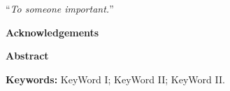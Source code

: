 \documentclass[
12pt, english,
onehalfspacing, %
nolistspacing, %
liststotoc, %
headsepline, %
consistentlayout, %
]{Thesis} %
\begin{document}
\hfill \enquote{\large \itshape To someone important.}\bigbreak

\newpage
\newpage


\begin{center}
{\bf \Large Acknowledgements}
\end{center}

\vspace{2cm}

\lipsum[2-3]

\newpage
\newpage



\begin{center}
{\bf \Large Abstract}
\end{center}

\vspace{2cm}

\lipsum[1]
    
\vspace{1cm}
    
\textbf{Keywords:} KeyWord I; KeyWord II; KeyWord II.
   
\newpage
\newpage


\tableofcontents %

\listoffigures %

\listoftables %

\newpage
\newpage


\mainmatter %

\pagestyle{thesis} %
\end{document}
